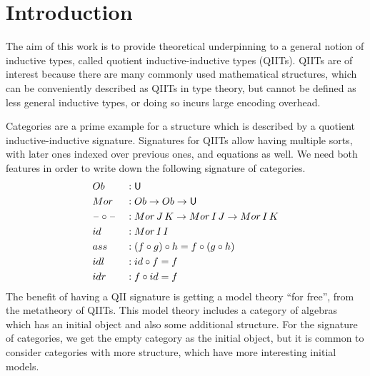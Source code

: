 \documentclass[sigplan,review,anonymous]{acmart}\settopmatter{printfolios=true,printccs=false,printacmref=false}
\begin{document}
\section{Introduction}

The aim of this work is to provide theoretical underpinning to a general notion
of inductive types, called quotient inductive-inductive types (QIITs). QIITs are
of interest because there are many commonly used mathematical structures, which
can be conveniently described as QIITs in type theory, but cannot be defined as
less general inductive types, or doing so incurs large encoding overhead.

Categories are a prime example for a structure which is described by a
quotient inductive-inductive signature. Signatures for QIITs allow
having multiple sorts, with later ones indexed over previous ones, and
equations as well. We need both features in order to write down the
following signature of categories.
\begingroup
\allowdisplaybreaks
\begin{alignat*}{3}
  & Ob  && : \mathsf{U} \\
  & Mor && : Ob\rightarrow Ob\rightarrow\mathsf{U} \\
  & \mathord{\hspace{1pt}\text{--}\hspace{1pt}}\circ\mathord{\hspace{1pt}\text{--}\hspace{1pt}} && : Mor\,J\,K\rightarrow Mor\,I\,J\rightarrow Mor\,I\,K \\
  & id && : Mor\,I\,I \\
  & ass && : (f\circ g)\circ h = f\circ(g\circ h) \\
  & idl && : id\circ f = f \\
  & idr && : f\circ id = f
\end{alignat*}
\endgroup
The benefit of having a QII signature is getting a model theory ``for free'',
from the metatheory of QIITs. This model theory includes a category of algebras
which has an initial object and also some additional structure. For the
signature of categories, we get the empty category as the initial object, but it
is common to consider categories with more structure, which have more
interesting initial models.
\end{document}
